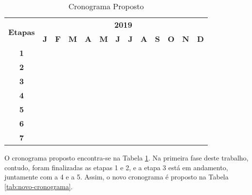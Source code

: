 \begin{table}[h]
  \centering
  \begin{tabular}{|c||c|c|c|c|c|c|c|c|c|c|c|c|}
  \hline
  \multirow{2}{*}{\textbf{\small{Etapas}}} & \multicolumn{12}{|c||}{\textbf{\small{2019}}} \\
  \cline{2-13}
   & \textbf{J} & \textbf{F} & \textbf{M} & \textbf{A} & \textbf{M} & \textbf{J} & \textbf{J} & \textbf{A} & \textbf{S} & \textbf{O} & \textbf{N} & \textbf{D} \\
  \hline \hline
  \textbf{\small{1}} & & & \cellcolor{gray} & \cellcolor{gray} & \cellcolor{gray} & & & & & & & \\ \hline
  \textbf{\small{2}} & & & & \cellcolor{gray} & & & & & & & & \\ \hline
  \textbf{\small{3}} & & & &  & \cellcolor{gray} & & & & & & & \\ \hline
  \textbf{\small{4}} & & & &  & \cellcolor{gray} & \cellcolor{gray} & \cellcolor{gray} & & & & & \\ \hline
  \textbf{\small{5}} & & & & & & \cellcolor{gray} & \cellcolor{gray} & \cellcolor{gray} & \cellcolor{gray} & & & \\ \hline
  \textbf{\small{6}} & & & & & & \cellcolor{gray} & \cellcolor{gray} & \cellcolor{gray} & \cellcolor{gray} & \cellcolor{gray} & & \\ \hline
  \textbf{\small{7}} & & & & & & & & & \cellcolor{gray} & \cellcolor{gray} & \cellcolor{gray} & \\ \hline
  \end{tabular}
  \caption{Cronograma Proposto}
  \label{tab:cronograma}
\end{table}

O cronograma proposto encontra-se na Tabela \ref{tab:cronograma}. Na primeira fase deste trabalho, contudo, foram finalizadas as etapas 1 e 2, e a etapa 3 está em andamento, juntamente com a 4 e a 5. Assim, o novo cronograma é proposto na Tabela \ref{tab:novo-cronograma}.

